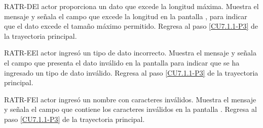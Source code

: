 	\begin{UCtrayectoriaA}{RATR-D}{El actor proporciona un dato que excede la longitud máxima.}
		\UCpaso[\UCsist] Muestra el mensaje  y señala el campo que excede la longitud en la pantalla , para indicar que el dato excede el tamaño máximo permitido.
		\UCpaso Regresa al paso \ref{CU7.1.1-P3} de la trayectoria principal.
	\end{UCtrayectoriaA}

	\begin{UCtrayectoriaA}{RATR-E}{El actor ingresó un tipo de dato incorrecto.}
		\UCpaso[\UCsist] Muestra el mensaje  y señala el campo que presenta el dato inválido en la pantalla  para indicar que se ha ingresado un tipo de dato inválido.
		\UCpaso Regresa al paso \ref{CU7.1.1-P3} de la trayectoria principal.
	\end{UCtrayectoriaA}

	\begin{UCtrayectoriaA}{RATR-F}{El actor ingresó un nombre con caracteres inválidos.}
	\UCpaso[\UCsist] Muestra el mensaje  y señala el campo que contiene los caracteres inválidos en la pantalla .
	\UCpaso Regresa al paso \ref{CU7.1.1-P3} de la trayectoria principal.
	\end{UCtrayectoriaA}

